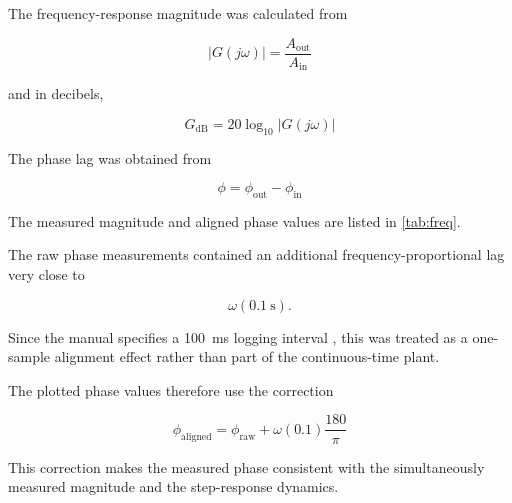 \documentclass[12pt,a4paper]{article}
\begin{document}
The frequency-response magnitude was calculated from

\begin{equation}
    |G(j\omega)|
    = \frac{A_{\mathrm{out}}}{A_{\mathrm{in}}}
    \tag{26}
\end{equation}

and in decibels,

\begin{equation}
    G_{\mathrm{dB}}
    = 20\log_{10}|G(j\omega)|
    \tag{27}
\end{equation}

The phase lag was obtained from

\begin{equation}
    \phi
    = \phi_{\mathrm{out}}-\phi_{\mathrm{in}}
    \tag{28}
\end{equation}

The measured magnitude and aligned phase values are listed in
\cref{tab:freq}.

The raw phase measurements contained an additional
frequency-proportional lag very close to

\[
\omega(0.1~\mathrm{s}).
\]

Since the manual specifies a \SI{100}{ms} logging interval
\cite{manual}, this was treated as a one-sample alignment effect
rather than part of the continuous-time plant.

The plotted phase values therefore use the correction

\begin{equation}
    \phi_{\mathrm{aligned}}
    = \phi_{\mathrm{raw}}
    + \omega(0.1)\frac{180}{\pi}
    \tag{29}
\end{equation}

This correction makes the measured phase consistent with the
simultaneously measured magnitude and the step-response dynamics.
\end{document}
